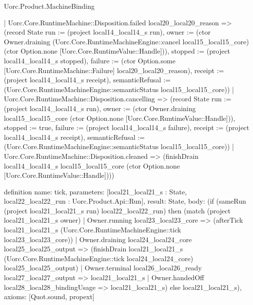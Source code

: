 \begin{lexlean}{Uorc.Product.MachineBinding}
\begin{semanticmodule}
{    | Uorc.Core.RuntimeMachine::Disposition.failed local20_local20_reason => (record State {run := (project local14_local14_s run), owner := (ctor Owner.draining (Uorc.Core.RuntimeMachineEngine::cancel local15_local15_core) (ctor Option.none [Uorc.Core.RuntimeValue::Handle])), stopped := (project local14_local14_s stopped), failure := (ctor Option.some [Uorc.Core.RuntimeMachine::Failure] local20_local20_reason), receipt := (project local14_local14_s receipt), semanticRefusal := (Uorc.Core.RuntimeMachineEngine::semanticStatus local15_local15_core)})
    | Uorc.Core.RuntimeMachine::Disposition.cancelling => (record State {run := (project local14_local14_s run), owner := (ctor Owner.draining local15_local15_core (ctor Option.none [Uorc.Core.RuntimeValue::Handle])), stopped := true, failure := (project local14_local14_s failure), receipt := (project local14_local14_s receipt), semanticRefusal := (Uorc.Core.RuntimeMachineEngine::semanticStatus local15_local15_core)})
    | Uorc.Core.RuntimeMachine::Disposition.cleaned => (finishDrain local14_local14_s local15_local15_core (ctor Option.none [Uorc.Core.RuntimeValue::Handle])))
}

definition{
  name: tick,
  parameters: [local21_local21_s : State, local22_local22_run : Uorc.Product.Api::Run],
  result: State,
  body: (if (sameRun (project local21_local21_s run) local22_local22_run) then (match (project local21_local21_s owner)
    | Owner.running local23_local23_core => (afterTick local21_local21_s (Uorc.Core.RuntimeMachineEngine::tick local23_local23_core))
    | Owner.draining local24_local24_core local25_local25_output => (finishDrain local21_local21_s (Uorc.Core.RuntimeMachineEngine::tick local24_local24_core) local25_local25_output)
    | Owner.terminal local26_local26_ready local27_local27_output => local21_local21_s
    | Owner.handedOff local28_local28_bindingUsage => local21_local21_s) else local21_local21_s),
  axioms: [Quot.sound, propext]
}


\end{semanticmodule}
\end{lexlean}
